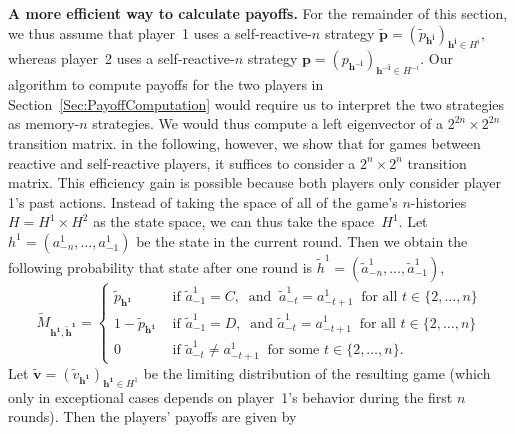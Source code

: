 \documentclass[11pt]{article}
\theoremstyle{plainCl1}
\theoremstyle{plainCl2}
\begin{document}

\noindent
{\bf A more efficient way to calculate payoffs.}
For the remainder of this section, we thus assume that player~1 uses a self-reactive-$n$ strategy $\mathbf{\tilde p}\!=\!(\tilde p_\mathbf{h^i})_{\mathbf{h^i}\in H^i}$, whereas player~2 uses a self-reactive-$n$ strategy $\mathbf{p}\!=\!(p_\mathbf{h^{-i}})_{\mathbf{h^{-i}}\in H^{-i}}$. 
Our algorithm to compute payoffs for the two players in Section~\ref{Sec:PayoffComputation} would require us to interpret the two strategies as memory-$n$ strategies. 
We would thus compute a left eigenvector of a $2^{2n}\!\times\!2^{2n}$ transition matrix. 
in the following, however, we show that for games between reactive and self-reactive players, it suffices to consider a $2^n\!\times\!2^n$ transition matrix.
This efficiency gain is possible because both players only consider player 1's past actions.  
Instead of taking the space of all of the game's $n$-histories $H\!=\!H^1\!\times\! H^2$  as the state space, we can thus take the space~$H^1$. 
Let \(h^1=(a^1_{-n},\ldots,a^1_{-1})\) be the state in the current round. 
Then we obtain the following probability that state after one round is  \(\tilde{h}^1=(\tilde{a}^1_{-n},\ldots,\tilde{a}^1_{-1})\),\begin{equation}\label{Eq:TransitionMatrixSelfReactive}
\tilde{M}_{\mathbf{h^1},\mathbf{ \tilde{h}^1}} = 
\begin{cases}
  \tilde{p}_\mathbf{h^1} & \text{ if } \tilde{a}^1_{-1}\! =\! C,~\text{ and }~\tilde{a}^1_{-t} \!=\! a^1_{-t + 1}~\text{ for all } t\!\in\!\{2,\ldots,n\}\\
  1 - \tilde{p}_\mathbf{h^1} & \text{ if } \tilde{a}^1_{-1}\!=\! D,~\text{ and } \tilde{a}^1_{-t} \!=\! a^1_{-t + 1}~\text{ for all } t\!\in\!\{2,\ldots,n\}\\
  0 & \text{ if } \tilde{a}^1_{-t} \!\neq\!  a^1_{-t + 1}~ \text{ for some } t\!\in\!\{2,\ldots,n\}.
\end{cases}
\end{equation}
Let $\mathbf{\tilde{v}}\!=\!(\tilde{v}_\mathbf{h^1})_{\mathbf{h^1}\in H^1}$ be the limiting distribution of the resulting game (which only in exceptional cases depends on player~1's behavior during the first $n$ rounds). Then the players' payoffs are given by
\end{document}
